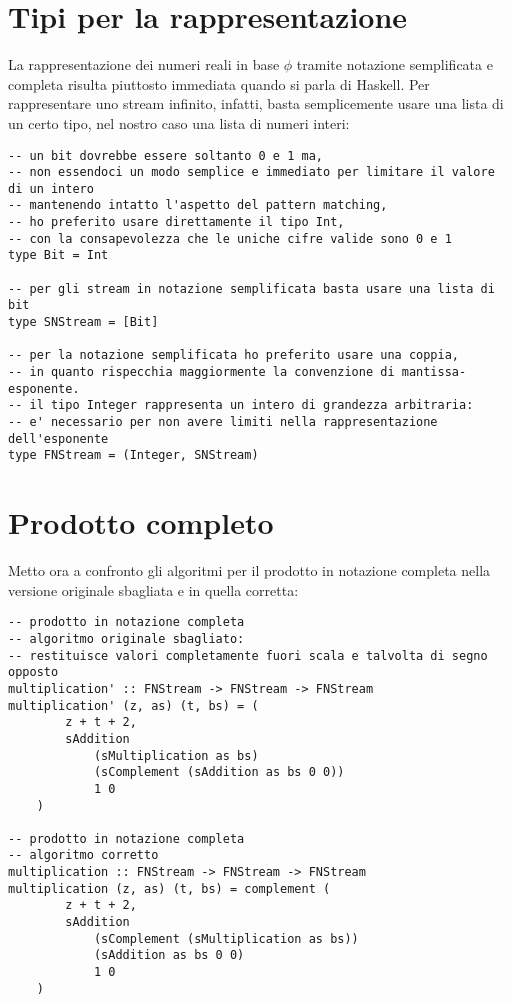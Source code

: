 \documentclass[Lau,oneside]{sapthesis}
\begin{document}
\section{Tipi per la rappresentazione}
La rappresentazione dei numeri reali in base $\phi$ tramite notazione semplificata e completa risulta piuttosto immediata quando si parla di Haskell. Per rappresentare uno stream infinito, infatti, basta semplicemente usare una lista di un certo tipo, nel nostro caso una lista di numeri interi:
\begin{verbatim}
-- un bit dovrebbe essere soltanto 0 e 1 ma,
-- non essendoci un modo semplice e immediato per limitare il valore di un intero
-- mantenendo intatto l'aspetto del pattern matching,
-- ho preferito usare direttamente il tipo Int,
-- con la consapevolezza che le uniche cifre valide sono 0 e 1
type Bit = Int

-- per gli stream in notazione semplificata basta usare una lista di bit
type SNStream = [Bit]

-- per la notazione semplificata ho preferito usare una coppia,
-- in quanto rispecchia maggiormente la convenzione di mantissa-esponente.
-- il tipo Integer rappresenta un intero di grandezza arbitraria:
-- e' necessario per non avere limiti nella rappresentazione dell'esponente
type FNStream = (Integer, SNStream)
\end{verbatim}


\section{Prodotto completo}
Metto ora a confronto gli algoritmi per il prodotto in notazione completa nella versione originale sbagliata e in quella corretta:
\begin{verbatim}
-- prodotto in notazione completa
-- algoritmo originale sbagliato:
-- restituisce valori completamente fuori scala e talvolta di segno opposto
multiplication' :: FNStream -> FNStream -> FNStream
multiplication' (z, as) (t, bs) = (
        z + t + 2,
        sAddition
            (sMultiplication as bs)
            (sComplement (sAddition as bs 0 0))
            1 0
    )

-- prodotto in notazione completa
-- algoritmo corretto
multiplication :: FNStream -> FNStream -> FNStream
multiplication (z, as) (t, bs) = complement (
        z + t + 2,
        sAddition
            (sComplement (sMultiplication as bs))
            (sAddition as bs 0 0)
            1 0
    )
\end{verbatim}
\end{document}
